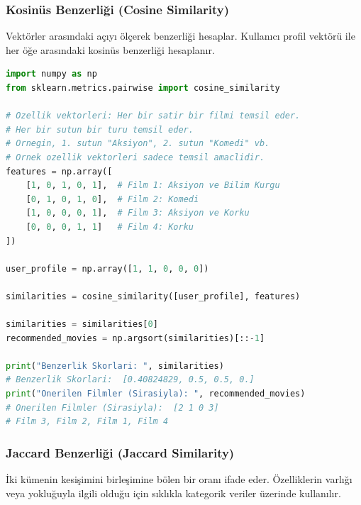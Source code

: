 \subsubsection{Kosinüs Benzerliği (Cosine Similarity)}

Vektörler arasındaki açıyı ölçerek benzerliği hesaplar. Kullanıcı profil vektörü ile her öğe arasındaki kosinüs benzerliği hesaplanır.

\begin{lstlisting}[language=Python]
import numpy as np
from sklearn.metrics.pairwise import cosine_similarity

# Ozellik vektorleri: Her bir satir bir filmi temsil eder.
# Her bir sutun bir turu temsil eder.
# Ornegin, 1. sutun "Aksiyon", 2. sutun "Komedi" vb.
# Ornek ozellik vektorleri sadece temsil amaclidir.
features = np.array([
    [1, 0, 1, 0, 1],  # Film 1: Aksiyon ve Bilim Kurgu
    [0, 1, 0, 1, 0],  # Film 2: Komedi
    [1, 0, 0, 0, 1],  # Film 3: Aksiyon ve Korku
    [0, 0, 0, 1, 1]   # Film 4: Korku
])

user_profile = np.array([1, 1, 0, 0, 0])

similarities = cosine_similarity([user_profile], features)

similarities = similarities[0]
recommended_movies = np.argsort(similarities)[::-1]

print("Benzerlik Skorlari: ", similarities)
# Benzerlik Skorlari:  [0.40824829, 0.5, 0.5, 0.]
print("Onerilen Filmler (Sirasiyla): ", recommended_movies)
# Onerilen Filmler (Sirasiyla):  [2 1 0 3]
# Film 3, Film 2, Film 1, Film 4
\end{lstlisting}

\newpage

\subsubsection{Jaccard Benzerliği (Jaccard Similarity)}

İki kümenin kesişimini birleşimine bölen bir oranı ifade eder. Özelliklerin varlığı veya yokluğuyla ilgili olduğu için sıklıkla kategorik veriler üzerinde kullanılır.

